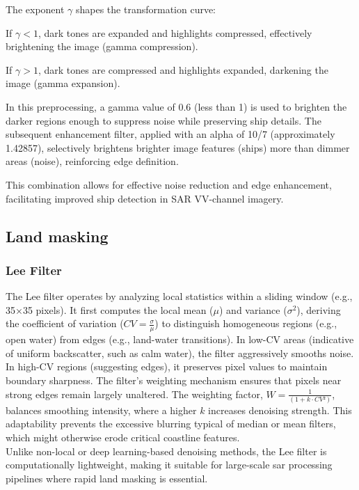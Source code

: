 \documentclass{article}
\begin{document}
	The exponent $\gamma$ shapes the transformation curve:
	
	If $\gamma<1$, dark tones are expanded and highlights compressed, effectively brightening the image (gamma compression).
	
	If $\gamma>1$, dark tones are compressed and highlights expanded, darkening the image (gamma expansion).
	
	In this preprocessing, a gamma value of 0.6 (less than 1) is used to brighten the darker regions enough to suppress noise while preserving ship details. The subsequent enhancement filter, applied with an alpha of 10/7 (approximately 1.42857), selectively brightens brighter image features (ships) more than dimmer areas (noise), reinforcing edge definition.
	
	This combination allows for effective noise reduction and edge enhancement, facilitating improved ship detection in SAR VV-channel imagery.
	\subsection{Land masking}
	\subsubsection{Lee Filter}
	
	
	The Lee filter operates by analyzing local statistics within a sliding window (e.g., 35×35 pixels). It first computes the local mean ($\mu$) and variance ($\sigma^2$), deriving the coefficient of variation ($CV = \frac{\sigma}{\mu}$) to distinguish homogeneous regions (e.g., open water) from edges (e.g., land-water transitions). In low-CV areas (indicative of uniform backscatter, such as calm water), the filter aggressively smooths noise. In high-CV regions (suggesting edges), it preserves pixel values to maintain boundary sharpness. The filter’s weighting mechanism ensures that pixels near strong edges remain largely unaltered. The weighting factor, $W =\frac{1}{(1 + k·CV²)}$, balances smoothing intensity, where a higher $k$ increases denoising strength. This adaptability prevents the excessive blurring typical of median or mean filters, which might otherwise erode critical coastline features.\\
	
	Unlike non-local or deep learning-based denoising methods, the Lee filter is computationally lightweight, making it suitable for large-scale \acrshort{sar} processing pipelines where rapid land masking is essential.\\
	
\end{document}
